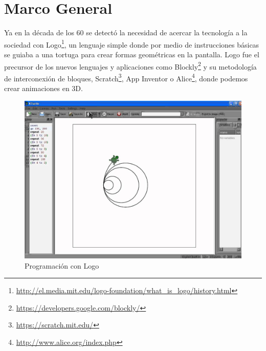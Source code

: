 \documentclass[a4paper, 12pt]{book}
\begin{document}
\section{Marco General}
\label{subsec:marcogral}
Ya en la década de los 60 se detectó la necesidad de acercar la tecnología a la sociedad con Logo\footnote{\url{http://el.media.mit.edu/logo-foundation/what_is_logo/history.html}}, un lenguaje simple donde por medio de instrucciones básicas se guiaba a una tortuga para crear formas geométricas en la pantalla.
Logo fue el precursor de los nuevos lenguajes y aplicaciones como Blockly\footnote{\url{https://developers.google.com/blockly/}} y su metodología de interconexión de bloques, Scratch\footnote{\url{https://scratch.mit.edu/}}, App Inventor o Alice\footnote{\url{http://www.alice.org/index.php}}, donde podemos crear animaciones en 3D.
\begin{figure}[H]
  \centering
  \includegraphics[width=0.60\linewidth, keepaspectratio]{img/logoProgramm}
  \caption{Programación con Logo}
  \label{fig:logoProgramm}
\end{figure} 
\end{document}
